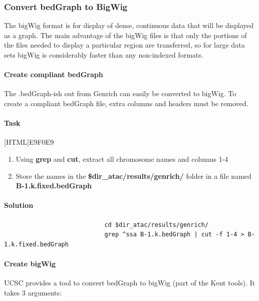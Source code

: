 \documentclass[12pt]{article}
\begin{document}
			\subsubsection{Convert bedGraph to BigWig}
				The bigWig format is for display of dense, continuous data that will be displayed as a graph. 
				The main advantage of the bigWig files is that only the portions of the files needed to display a particular region are transferred, so for large data sets bigWig is considerably faster than any non-indexed formats.


			\paragraph{Create compliant bedGraph }
				The  .bedGraph-ish out from Genrich can easily be converted to bigWig. 
				To create a compliant bedGraph file, extra columns and headers must be removed. 
				
				\paragraph{Task}
					
					[HTML]{E9F0E9}{\parbox{\linewidth}{%
						\begin{enumerate}
							\item Using \textbf{grep} and \textbf{cut}, extract all chromosome names and columns 1-4
							\item Store the names in the \textbf{\$dir\_atac/results/genrich/} folder in a file named \textbf{B-1.k.fixed.bedGraph}
						\end{enumerate}
					}}
				
				\paragraph{Solution}
					
					\begin{minipage}{\linewidth}
						\begin{lstlisting}
							cd $dir_atac/results/genrich/
							grep ^ssa B-1.k.bedGraph | cut -f 1-4 > B-1.k.fixed.bedGraph
						\end{lstlisting}
					\end{minipage}
					
					
			\paragraph{Create bigWig}
					UCSC provides a tool to convert bedGraph to bigWig (part of the Kent tools). It takes 3 arguments:\\
					
\end{document}
